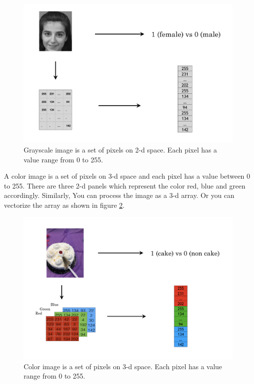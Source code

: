 \documentclass[
  12pt,
]{krantz}
\begin{document}
\begin{figure}

{\centering \includegraphics[width=0.8\linewidth]{images/grayscaleimage} 

}

\caption{Grayscale image is a set of pixels on 2-d space. Each pixel has a value range from 0 to 255.}\label{fig:grayscaleimage}
\end{figure}

A color image is a set of pixels on 3-d space and each pixel has a value between 0 to 255. There are three 2-d panels which represent the color red, blue and green accordingly. Similarly, You can process the image as a 3-d array. Or you can vectorize the array as shown in figure \ref{fig:colorimage}.

\begin{figure}

{\centering \includegraphics[width=0.8\linewidth]{images/colorimage} 

}

\caption{Color image is a set of pixels on 3-d space. Each pixel has a value range from 0 to 255.}\label{fig:colorimage}
\end{figure}
\end{document}
